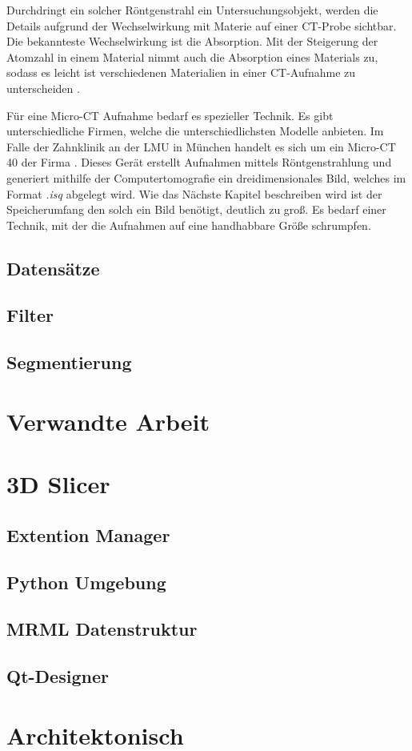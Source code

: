Durchdringt ein solcher Röntgenstrahl ein Untersuchungsobjekt, werden die Details
aufgrund der Wechselwirkung mit Materie auf einer CT-Probe sichtbar. Die
bekannteste Wechselwirkung ist die Absorption. Mit der Steigerung der Atomzahl in
einem Material nimmt auch die Absorption eines Materials zu, sodass es leicht
ist verschiedenen Materialien in einer CT-Aufnahme zu unterscheiden \citep{nib2024}.

Für eine Micro-CT Aufnahme bedarf es spezieller Technik. Es gibt
unterschiedliche Firmen, welche die unterschiedlichsten Modelle anbieten. Im
Falle der Zahnklinik an der LMU in München handelt es sich um ein Micro-CT 40
der Firma \citet{scanco2024}. Dieses Gerät erstellt Aufnahmen mittels
Röntgenstrahlung und generiert mithilfe der Computertomografie ein
dreidimensionales Bild, welches im Format \textit{.isq} abgelegt wird. Wie das Nächste
Kapitel beschreiben wird ist der Speicherumfang den solch ein Bild benötigt,
deutlich zu groß. Es bedarf einer Technik, mit der die Aufnahmen auf eine
handhabbare Größe schrumpfen.

\subsection{Datensätze}

\subsection{Filter}

\subsection{Segmentierung}

\section{Verwandte Arbeit}
\label{sec:verwwandte_arbeit}

\section{3D Slicer}
\label{sec:3d_slicer}

\subsection{Extention Manager}

\subsection{Python Umgebung}

\subsection{MRML Datenstruktur}

\subsection{Qt-Designer}

\section{Architektonisch}
\label{sec:architektonisch}